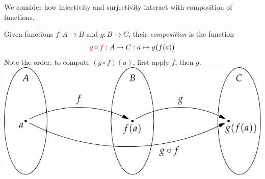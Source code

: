 % 
% 
% 




We consider how injectivity and surjectivity interact with composition of functions.

\begin{defn}[lower separated=false, sidebyside, sidebyside align=top seam, sidebyside gap=0pt, righthand width=0.4\linewidth]{}{}
	Given functions $f:A\to B$ and $g:B\to C$, their \emph{composition} is the function
	\[
		\textcolor{red}{g\circ f}:A\to C:a\mapsto g\bigl(f(a)\bigr)
	\]
	Note the order: to compute $(g\circ f)(a)$, first apply $f$, then $g$.
	\tcblower
	\flushright
	\includegraphics[scale=1]{sets-15-setcomp}
\end{defn}

